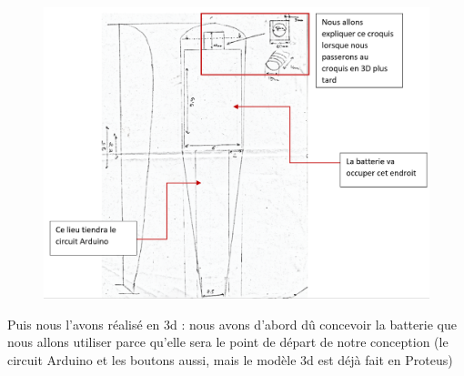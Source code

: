 \begin{figure}[!htbp]
    \centering
    \includegraphics[width=\linewidth]{assets/conception1/5.png}
\end{figure}

\FloatBarrier

Puis nous l’avons réalisé en 3d : nous avons d’abord dû concevoir la batterie que nous allons utiliser parce qu’elle sera le point de départ de notre conception (le circuit Arduino et les boutons aussi, mais le modèle 3d est déjà fait en Proteus)

